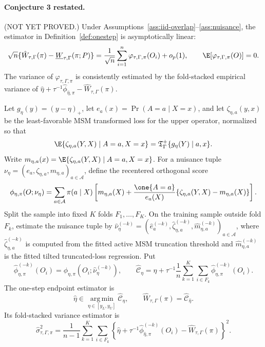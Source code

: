 \paragraph{Conjecture 3 restated.}
(NOT YET PROVED.)  Under Assumptions~\ref{ass:iid-overlap}--\ref{ass:nuisance}, the estimator in Definition~\ref{def:onestep} is asymptotically linear:
\[
\sqrt n\{\hat W_{\tau,\Gamma}(\pi)-\underline W_{\tau,\Gamma}(\pi;P)\}
=
\frac{1}{\sqrt n}\sum_{i=1}^n
\varphi_{\tau,\Gamma,\pi}(O_i)+o_p(1),
\qquad
\E[\varphi_{\tau,\Gamma,\pi}(O)]=0.
\]
The variance of \(\varphi_{\tau,\Gamma,\pi}\) is consistently estimated by the fold-stacked empirical variance of \(\hat\eta+\tau^{-1}\hat\phi_{\hat\eta,\pi}-\hat W_{\tau,\Gamma}(\pi)\).

\begin{definition}\label{def:onestep}
Let \(g_\eta(y)=(y-\eta)_+\), let \(e_a(x)=\Pr(A=a\mid X=x)\), and let
\(\zeta_{\eta,a}(y,x)\) be the least-favorable MSM transformed loss for the upper operator, normalized so that
\[
\E\{\zeta_{\eta,a}(Y,X)\mid A=a,X=x\}
=\mathfrak T_{\Gamma}^{+}\{g_\eta(Y)\mid a,x\}.
\]
Write \(m_{\eta,a}(x)=\E\{\zeta_{\eta,a}(Y,X)\mid A=a,X=x\}\).  For a nuisance tuple
\(\nu_\eta=(e_a,\zeta_{\eta,a},m_{\eta,a})_{a\in\mathcal A}\), define the recentered orthogonal score
\[
\phi_{\eta,\pi}(O;\nu_\eta)
=
\sum_{a\in\mathcal A}\pi(a\mid X)
\left[
m_{\eta,a}(X)
+\frac{\one\{A=a\}}{e_a(X)}
\{\zeta_{\eta,a}(Y,X)-m_{\eta,a}(X)\}
\right].
\]
Split the sample into fixed \(K\) folds \(F_1,\ldots,F_K\).  On the training sample outside fold
\(F_k\), estimate the nuisance tuple by
\(\widehat\nu^{(-k)}_\eta=(\widehat e_a^{(-k)},\widehat\zeta_{\eta,a}^{(-k)},\widehat m_{\eta,a}^{(-k)})_{a\in\mathcal A}\), where
\(\widehat\zeta_{\eta,a}^{(-k)}\) is computed from the fitted active MSM truncation threshold and
\(\widehat m_{\eta,a}^{(-k)}\) is the fitted tilted truncated-loss regression.  Put
\[
\widehat\phi_{\eta,\pi}^{(-k)}(O_i)
=\phi_{\eta,\pi}(O_i;\widehat\nu_\eta^{(-k)}),
\qquad
\widehat{\mathcal C}_\eta
=
\eta+\tau^{-1}\frac1n
\sum_{k=1}^K\sum_{i\in F_k}
\widehat\phi_{\eta,\pi}^{(-k)}(O_i).
\]
The one-step endpoint estimator is
\[
\widehat\eta\in\operatorname*{arg\,min}_{\eta\in[y_L,y_U]}\widehat{\mathcal C}_\eta,
\qquad
\widehat W_{\tau,\Gamma}(\pi)=\widehat{\mathcal C}_{\widehat\eta}.
\]
Its fold-stacked variance estimator is
\[
\widehat\sigma_{\tau,\Gamma,\pi}^2
=
\frac1{n-1}\sum_{k=1}^K\sum_{i\in F_k}
\left\{
\widehat\eta+\tau^{-1}\widehat\phi_{\widehat\eta,\pi}^{(-k)}(O_i)
-\widehat W_{\tau,\Gamma}(\pi)
\right\}^2 .
\]
\end{definition}

